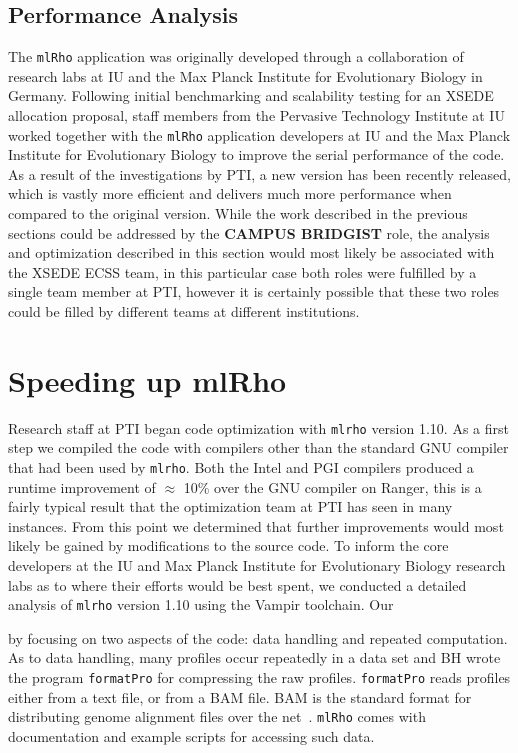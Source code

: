 \documentclass{sig-alternate}
\newcommand{\ty}{\texttt}
\begin{document}
\subsection{Performance Analysis}\label{subsec:analysis}
The \texttt{mlRho} application was originally developed through a collaboration of research labs at IU and the
Max Planck Institute for Evolutionary Biology in Germany. Following initial benchmarking and scalability
testing for an XSEDE allocation proposal, staff members from the Pervasive Technology Institute at IU worked
together with the \texttt{mlRho} application developers at IU and the Max Planck Institute for Evolutionary
Biology to improve the serial performance of the code. As a result of the investigations by PTI, a new version
has been recently released, which is vastly more efficient and delivers much more performance when compared to
the original version. While the work described in the previous sections could be addressed by the {\bf CAMPUS
  BRIDGIST} role, the analysis and optimization described in this section would most likely be associated with
the XSEDE ECSS team, in this particular case both roles were fulfilled by a single team member at PTI,
however it is certainly possible that these two roles could be filled by different teams at different
institutions.

\section{Speeding up mlRho}
Research staff at PTI began code optimization with \texttt{mlrho} version 1.10. As a first step we compiled
the code with compilers other than the standard GNU compiler that had been used by \texttt{mlrho}. Both the
Intel and PGI compilers produced a runtime improvement of $\approx$ 10\% over the GNU compiler on Ranger, this
is a fairly typical result that the optimization team at PTI has seen in many instances. From this point we
determined that further improvements would most likely be gained by modifications to the source code. To inform
the core developers at the IU and Max Planck Institute for Evolutionary Biology research labs as to where
their efforts would be best spent, we conducted a detailed analysis of \texttt{mlrho} version 1.10 using the
Vampir toolchain. Our 

  by focusing on two aspects of the code: data
handling and repeated computation. As to data handling, many profiles occur repeatedly in a data set and BH
wrote the program \ty{formatPro} for compressing the raw profiles. \ty{formatPro} reads profiles either from a
text file, or from a BAM file. BAM is the standard format for distributing genome alignment files over the
net~\citep{li09:seq}. \ty{mlRho} comes with documentation and example scripts for accessing such data.
\end{document}
